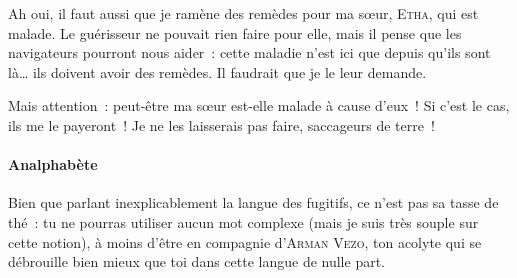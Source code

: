 {    Ah oui, il faut aussi que je ramène des remèdes pour ma sœur, \textsc{Etha}, qui est malade.
    Le guérisseur ne pouvait rien faire pour elle, mais il pense que les navigateurs pourront nous aider~:  cette maladie n’est ici que depuis qu’ils sont là… ils doivent avoir des remèdes.
    Il faudrait que je le leur demande.

    Mais attention~:  peut-être ma sœur est-elle malade à cause d’eux~!  Si c’est le cas, ils me le payeront~!  Je ne les laisserais pas faire, saccageurs de terre~!

    \paragraph{Analphabète}{
        Bien que parlant inexplicablement la langue des fugitifs, ce n’est pas sa tasse de thé~:  tu ne pourras utiliser aucun mot complexe (mais je suis très souple sur cette notion), à moins d’être en compagnie d’\textsc{Arman Vezo}, ton acolyte qui se débrouille bien mieux que toi dans cette langue de nulle part.
    }
}

